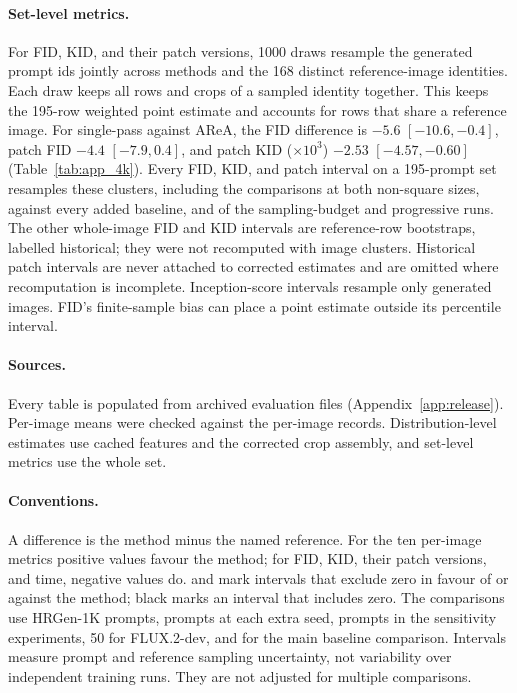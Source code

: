\paragraph{Set-level metrics.} For FID, KID, and their patch versions, 1000 draws resample the generated prompt ids jointly across methods and the 168 distinct reference-image identities. Each draw keeps all rows and crops of a sampled identity together. This keeps the 195-row weighted point estimate and accounts for rows that share a reference image. For single-pass \sca{} against AReA, the FID difference is $-5.6$ $[-10.6,-0.4]$, patch FID $-4.4$ $[-7.9,0.4]$, and patch KID ($\times10^3$) $-2.53$ $[-4.57,-0.60]$ (Table~\ref{tab:app_4k}). Every FID, KID, and patch interval on a 195-prompt set resamples these clusters, including the comparisons at both non-square sizes, against every added baseline, and of the sampling-budget and progressive runs. The other whole-image FID and KID intervals are reference-row bootstraps, labelled historical; they were not recomputed with image clusters. Historical patch intervals are never attached to corrected estimates and are omitted where recomputation is incomplete. Inception-score intervals resample only generated images. FID's finite-sample bias can place a point estimate outside its percentile interval.

\paragraph{Sources.} Every table is populated from archived evaluation files (Appendix~\ref{app:release}). Per-image means were checked against the per-image records. Distribution-level estimates use cached features and the corrected crop assembly, and set-level metrics use the whole set.

\paragraph{Conventions.} A difference is the method minus the named reference. For the ten per-image metrics positive values favour the method; for FID, KID, their patch versions, and time, negative values do.  and  mark intervals that exclude zero in favour of or against the method; black marks an interval that includes zero. The comparisons use \nhrgen{} HRGen-1K prompts, \nseed{} prompts at each extra seed, \nabl{} prompts in the sensitivity experiments, 50 for FLUX.2-dev, and \nmain{} for the main baseline comparison. Intervals measure prompt and reference sampling uncertainty, not variability over independent training runs. They are not adjusted for multiple comparisons.

